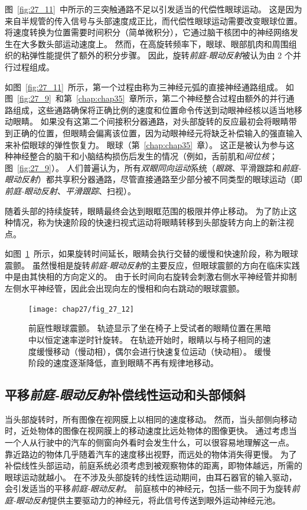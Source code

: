 图~\ref{fig:27_11}~中所示的三突触通路不足以引发适当的代偿性眼球运动。
这是因为来自半规管的传入信号与头部速度成正比，而代偿性眼球运动需要改变眼球位置。
将速度转换为位置需要时间积分（简单微积分），它通过脑干核团中的神经网络发生在大多数头部运动速度上。
然而，在高旋转频率下，眼球、眼部肌肉和周围组织的粘弹性能提供了额外的积分步骤。
因此，旋转\textit{前庭-眼动反射}被认为由 2 个并行过程组成。


如图~\ref{fig:27_11}~所示，第一个过程由称为三神经元弧的直接神经通路组成。
如图~\ref{fig:27_9}~和第~\ref{chap:chap35}~章所示，第二个神经整合过程由额外的并行通路组成，这些通路确保将正确比例的速度和位置命令传送到动眼神经核以适当地移动眼睛。
如果没有这第二个间接积分器通路，对头部旋转的反应最初会将眼睛带到正确的位置，但眼睛会偏离该位置，因为动眼神经元将缺乏补偿输入的强直输入来补偿眼球的弹性恢复力。
眼球（第~\ref{chap:chap35}~章）。
这正是被认为参与这种神经整合的脑干和小脑结构损伤后发生的情况（例如，舌前肌和\textit{间位核}；图~\ref{fig:27_9}）。
人们普遍认为，所有\textit{双眼同向运动}系统（\textit{眼跳}、平滑跟踪和\textit{前庭-眼动反射}）都共享积分器通路，尽管直接通路至少部分被不同类型的眼球运动（即\textit{前庭-眼动反射}、\textit{平滑跟踪}、扫视）。


随着头部的持续旋转，眼睛最终会达到眼眶范围的极限并停止移动。
为了防止这种情况，称为快速阶段的快速扫视式运动将眼睛转移到头部旋转方向上的新注视点。


如图~\ref{fig:27_12}~所示，如果旋转时间延长，眼睛会执行交替的缓慢和快速阶段，称为眼球震颤。
虽然慢相是旋转\textit{前庭-眼动反射}的主要反应，但眼球震颤的方向在临床实践中是由其快相的方向定义的。
由于长时间向右旋转会刺激右侧水平神经管并抑制左侧水平神经管，因此会出现向左的慢相和向右跳动的眼球震颤。


\begin{figure}[htbp]
	\centering
	\texttt{[image: chap27/fig\_27\_12]}
	\caption{前庭性眼球震颤。
		轨迹显示了坐在椅子上受试者的眼睛位置在黑暗中以恒定速率逆时针旋转。
		在轨迹开始时，眼睛以与椅子相同的速度缓慢移动（慢动相），偶尔会进行快速复位运动（快动相）。
		缓慢阶段的速度逐渐降低，直到眼睛不再有规律地移动。}
	\label{fig:27_12}
\end{figure}



\subsection{平移\textit{前庭-眼动反射}补偿线性运动和头部倾斜}

当头部旋转时，所有图像在视网膜上以相同的速度移动。
然而，当头部侧向移动时，近处物体的图像在视网膜上的移动速度比远处物体的图像更快。
通过考虑当一个人从行驶中的汽车的侧窗向外看时会发生什么，可以很容易地理解这一点。
靠近路边的物体几乎随着汽车的速度移出视野，而远处的物体消失得更慢。
为了补偿线性头部运动，前庭系统必须考虑到被观察物体的距离，即物体越远，所需的眼球运动就越小。
在不涉及头部旋转的线性运动期间，由耳石器官的输入驱动，会引发适当的平移\textit{前庭-眼动反射}。
前庭核中的神经元，包括一些不同于为旋转\textit{前庭-眼动反射}提供主要驱动力的神经元，将此信号传送到眼外运动神经元池。


